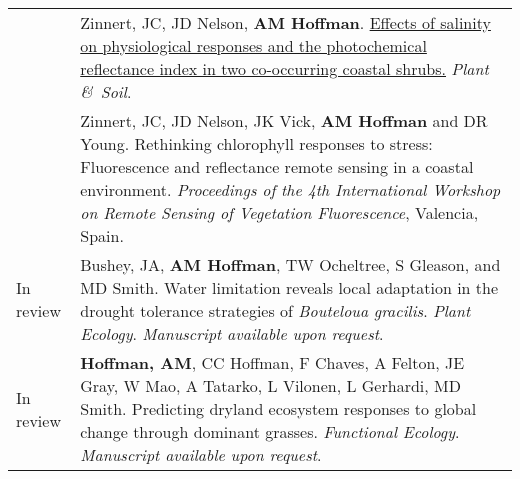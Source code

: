 \documentclass[letterpaper]{deedy-resume} %
\begin{document}
\begin{tabular}{>{\raggedleft\arraybackslash}p{2cm}p{16cm}}
2011 & Zinnert, JC, JD Nelson, \textbf{AM Hoffman}. \href{http://link.springer.com/article/10.1007\%2Fs11104-011-0955-z}{Effects of salinity on physiological responses and the photochemical reflectance index in two co-occurring coastal shrubs.} \textcolor{special}{\textit{Plant \&\ Soil}}. \\

2010 & Zinnert, JC, JD Nelson, JK Vick, \textbf{AM Hoffman} and DR Young. Rethinking chlorophyll responses to stress:  Fluorescence and reflectance remote sensing in a coastal environment.  \textit{Proceedings of the 4th International Workshop on Remote Sensing of Vegetation Fluorescence}, Valencia, Spain.\\






In review & Bushey, JA, \textbf{AM Hoffman}, TW Ocheltree, S Gleason, and MD Smith. Water limitation reveals local adaptation in the drought tolerance strategies of \textit{Bouteloua gracilis}. \textcolor{special}{\textit{Plant Ecology}}. \textit{Manuscript available upon request}.\\

In review & \textbf{Hoffman, AM}, CC Hoffman, F Chaves, A Felton, JE Gray, W Mao, A Tatarko, L Vilonen, L Gerhardi, MD Smith. Predicting dryland ecosystem responses to global change through dominant grasses. \textcolor{special}{\textit{Functional Ecology}}. \textit{Manuscript available upon request}.\\


\end{tabular}
\end{document}
